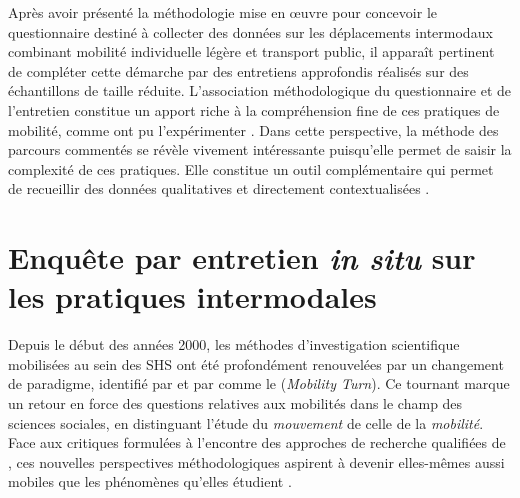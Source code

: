 \begin{refsegment}
Après avoir présenté la méthodologie mise en œuvre pour concevoir le questionnaire destiné à collecter des données sur les déplacements intermodaux combinant mobilité individuelle légère et transport public, il apparaît pertinent de compléter cette démarche par des entretiens approfondis réalisés sur des échantillons de taille réduite. L'association méthodologique du questionnaire et de l'entretien constitue un apport riche à la compréhension fine de ces pratiques de mobilité, comme ont pu l'expérimenter \textcolor{blue}{\textcite[97]{dureau_lobservation_2014}}. Dans cette perspective, la méthode des parcours commentés se révèle vivement intéressante puisqu'elle permet de saisir la complexité de ces pratiques. Elle constitue un outil complémentaire qui permet de recueillir des données qualitatives et  directement contextualisées \textcolor{blue}{\autocite[109]{bergeron_uncovering_2014}}.%

    \newpage
\section{Enquête par entretien \textsl{in situ} sur les pratiques intermodales
    \label{chap3:parcours-commente}
    }

Depuis le début des années 2000, les méthodes d’investigation scientifique mobilisées au sein des \acrfull{SHS} ont été profondément renouvelées par un changement de paradigme, identifié par \textcolor{blue}{\textcite[207]{sheller_new_2006}} et par \textcolor{blue}{\textcite{bonnet_territoires_2000}} comme le  (\textit{Mobility Turn}). Ce tournant marque un retour en force des questions relatives aux mobilités dans le champ des sciences sociales, en distinguant l’étude du \textit{mouvement} de celle de la \textit{mobilité}. Face aux critiques formulées à l’encontre des approches de recherche qualifiées de , ces nouvelles perspectives méthodologiques aspirent à devenir elles-mêmes aussi mobiles que les phénomènes qu’elles étudient \textcolor{blue}{\autocite[207]{buscher_mobile_2009}}.%


\end{refsegment}

